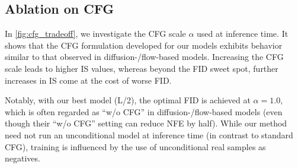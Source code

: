 \documentclass{article}
\theoremstyle{plain}
\theoremstyle{definition}
\theoremstyle{remark}
\begin{document}
\subsection{Ablation on CFG}
\label{section:exp_cfg}

In \cref{fig:cfg_tradeoff}, we investigate the CFG scale $\alpha$ used at inference time.
It shows that the CFG formulation developed for our models exhibits behavior similar to that observed in diffusion-/flow-based models.
Increasing the CFG scale leads to higher IS values, whereas beyond the FID sweet spot, further increases in IS come at the cost of worse FID.

Notably, with our best model (L/2), the optimal FID is achieved at $\alpha{=}1.0$, which is often regarded as ``w/o CFG'' in diffusion-/flow-based models (even though their ``w/o CFG'' setting can reduce NFE by half).
While our method need not run an unconditional model at inference time (in contrast to standard CFG), training is influenced by the use of unconditional real samples as negatives.
\end{document}
